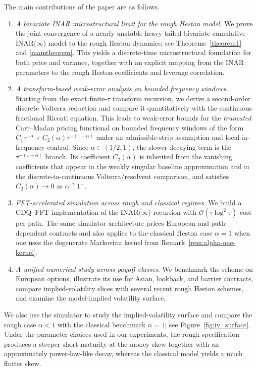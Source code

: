 \documentclass[letterpaper]{article}
\numberwithin{equation}{section}
\theoremstyle{definition}
\theoremstyle{remark}
\begin{document}
The main contributions of the paper are as follows.
\begin{enumerate}
  \item \textit{A bivariate INAR microstructural limit for the rough Heston model.} We prove the joint convergence of a nearly unstable heavy-tailed bivariate cumulative INAR($\infty$) model to the rough Heston dynamics; see Theorems~\ref{theorem1} and \ref{maintheorem}. This yields a discrete-time microstructural foundation for both price and variance, together with an explicit mapping from the INAR parameters to the rough Heston coefficients and leverage correlation.

  \item \textit{A transform-based weak-error analysis on bounded frequency windows.} Starting from the exact finite-$\tau$ transform recursion, we derive a second-order discrete Volterra reduction and compare it quantitatively with the continuous fractional Riccati equation. This leads to weak-error bounds for the \emph{truncated} Carr--Madan pricing functional on bounded frequency windows of the form $C_1\tau^{-\alpha}+C_2(\alpha)\tau^{-(1-\alpha)}$ under an admissible-strip assumption and local-in-frequency control. Since $\alpha\in(1/2,1)$, the slower-decaying term is the $\tau^{-(1-\alpha)}$ branch. Its coefficient $C_2(\alpha)$ is inherited from the vanishing coefficients that appear in the weakly singular baseline approximation and in the discrete-to-continuous Volterra/resolvent comparison, and satisfies $C_2(\alpha)\to0$ as $\alpha\uparrow1^-$.

  \item \textit{FFT-accelerated simulation across rough and classical regimes.} We build a CDQ--FFT implementation of the INAR($\infty$) recursion with $\mathcal O(\tau\log^2\tau)$ cost per path. The same simulator architecture prices European and path-dependent contracts and also applies to the classical Heston case $\alpha=1$ when one uses the degenerate Markovian kernel from Remark~\ref{rem:alpha-one-kernel}.

  \item \textit{A unified numerical study across payoff classes.} We benchmark the scheme on European options, illustrate its use for Asian, lookback, and barrier contracts, compare implied-volatility slices with several recent rough Heston schemes, and examine the model-implied volatility surface.
\end{enumerate}

We also use the simulator to study the implied-volatility surface and compare the rough case $\alpha<1$ with the classical benchmark $\alpha=1$; see Figure~\ref{fig:iv_surface}. Under the parameter choices used in our experiments, the rough specification produces a steeper short-maturity at-the-money skew together with an approximately power-law-like decay, whereas the classical model yields a much flatter skew.
\end{document}
